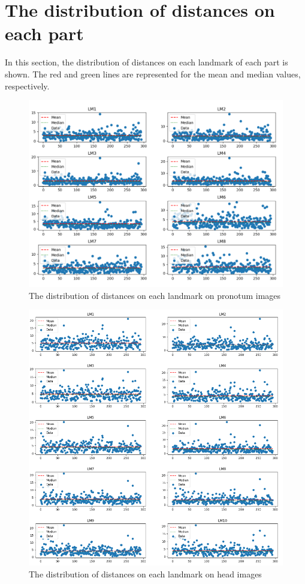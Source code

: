 \documentclass[review]{elsarticle}
\begin{document}
\section{The distribution of distances on each part}
\label{appdixB}
In this section, the distribution of distances on each landmark of each part is shown. The red and green lines are represented for the mean and median values, respectively.
\begin{figure}[htbp]
    \centering
    \includegraphics[scale=0.4]{images/charts/pronotum_2.png}
    \caption{The distribution of distances on each landmark on pronotum images}
\end{figure}

\begin{figure}[htbp]
    \centering
    \includegraphics[scale=0.5]{images/charts/tete_2.png}
    \caption{The distribution of distances on each landmark on head images}
\end{figure}
\end{document}

